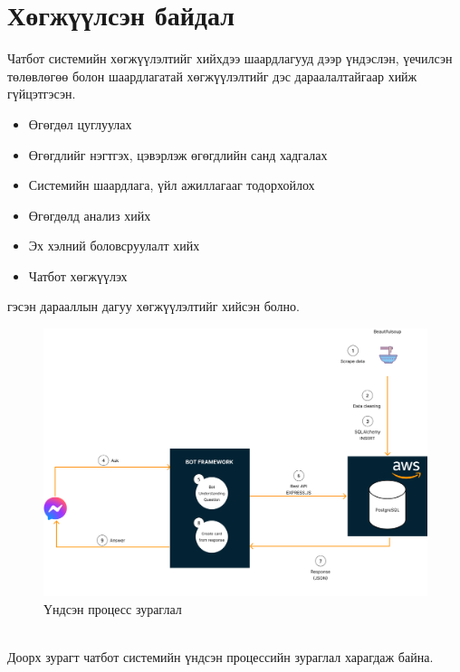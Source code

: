\section{Хөгжүүлсэн байдал}
Чатбот системийн хөгжүүлэлтийг хийхдээ шаардлагууд дээр үндэслэн, үечилсэн төлөвлөгөө болон шаардлагатай хөгжүүлэлтийг дэс дараалалтайгаар хийж гүйцэтгэсэн.
\begin{itemize}
  \item Өгөгдөл цуглуулах
  \item Өгөгдлийг нэгтгэх, цэвэрлэж өгөгдлийн санд хадгалах
  \item Системийн шаардлага, үйл ажиллагааг тодорхойлох
  \item Өгөгдөлд анализ хийх
  \item Эх хэлний боловсруулалт хийх
  \item Чатбот хөгжүүлэх
\end{itemize}
гэсэн дарааллын дагуу хөгжүүлэлтийг хийсэн болно.
\begin{figure}[ht]
  \centering
  \includegraphics[width = \textwidth-2cm]{images/mainProcess.png}
  \caption{Үндсэн процесс зураглал}\label{mainProcess}
\end{figure}
\\Доорх зурагт чатбот системийн үндсэн процессийн зураглал харагдаж байна. 

\newpage
